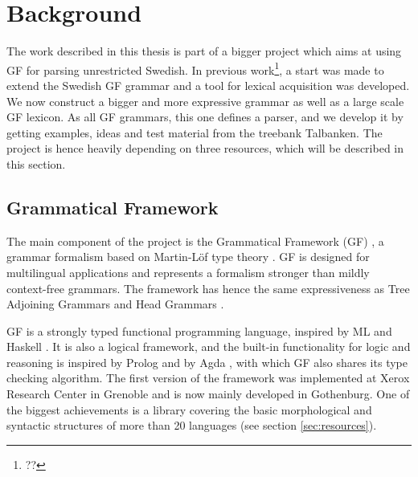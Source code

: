 \documentclass{report}
\begin{document}

\chapter{Background}  
\label{sec:background}
The work described in this thesis is part of a bigger project which aims at
using GF for parsing unrestricted Swedish. 
In previous work\footnote{??}, a start was made to extend the Swedish GF grammar
and a tool for lexical acquisition was developed.
We now construct a bigger
and more expressive grammar as well as a large scale GF lexicon.
As all GF grammars, this one defines a parser, and we develop it by getting
examples, ideas and test material from the treebank Talbanken.
The project is hence heavily depending on three resources, which will be described
in this section.

\section{Grammatical Framework}
\label{sec:gf}
The main component of the project is the Grammatical Framework (GF) \cite{gfbok}, %
a grammar formalism based on Martin-Löf type theory \cite{martinlof}. GF is
designed for multilingual applications and represents a formalism
stronger than mildly context-free grammars. The framework has  hence the same expressiveness
as Tree Adjoining Grammars \cite{tag} and Head Grammars \cite{hg}.

GF is a strongly typed functional programming language, inspired by
ML \cite{ml} and Haskell \cite{haskell}. It is also a logical framework,
and the built-in functionality for logic and reasoning 
is inspired by \textlambda Prolog \cite{prolog} and 
by Agda \cite{agda}, with which GF also shares its type checking algorithm.
The first version of the framework was implemented at Xerox Research Center
in Grenoble and is now mainly developed in Gothenburg. One of the biggest
achievements is a library covering the 
basic morphological and syntactic structures of more than
20 languages (see section \ref{sec:resources}).
\end{document}
